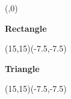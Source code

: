 

\Defnum(\a,0)



\begin{center}
{\Huge \bf{Rectangle}}
\bigskip

\begin{lapdf}(15,15)(-7.5,-7.5)
\end{lapdf}

\newpage

{\Huge \bf{Triangle}}
\bigskip

\begin{lapdf}(15,15)(-7.5,-7.5)
 \Resetcol
\end{lapdf}
\end{center}

